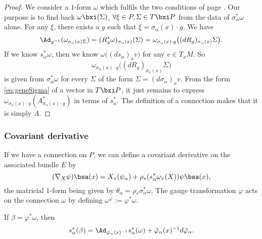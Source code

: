 \begin{proof}
We consider a $1$-form $\omega$ which fulfils the two conditions of page \pageref{pg:def:conne}. Our purpose is to find back $\omega\bxi(\Sigma)$, $\forall\xi\in P,\Sigma\in T\bxi P$ from the data of $\sigma_{\alpha}^*\omega$ alone. For any $\xi$, there exists a $g$ such that $\xi=\sigma_{\alpha}(x)\cdot g$. We have
\begin{equation}
  \Ad_{g^{-1}}(\omega_{\sigma_{\alpha}(x)\Sigma})=(R^*_g\omega)_{\sigma_{\alpha}(x)}(\Sigma)
             =\omega_{\sigma_{\alpha}(x)\cdot g}\big( (dR_g)_{\sigma_{\alpha}(x)}\Sigma \big).
\end{equation}
If we know $s_{\alpha}^*\omega$, then we know $\omega\big(  (ds_{\alpha})_xv  \big)$ for any $v\in T_xM$. So 
\[
   \omega_{\sigma_{\alpha}(x)\cdot g}\big( (dR_g)_{\sigma_{\alpha}(x)}\Sigma\big)
\]
is given from $\sigma_{\alpha}^*\omega$ for every $\Sigma$ of the form $\Sigma=(d\sigma_{\alpha})_xv$. From the form \eqref{eq:geneSigma} of a vector in $T\bxi P$, it just remains to express $\omega_{\sigma_{\alpha}(x)\cdot g}(A^*_{\sigma_{\alpha}(x)\cdot g})$ in terms of $s_{\alpha}^*$. The definition of a connection makes that it is simply $A$.

\end{proof}

\subsubsection{Covariant derivative}

If we have a connection on $P$, we can define a covariant derivative on the associated bundle $E$ by 
\[
  (\nabla_X\psi)\bsa(x)=X_x(\psi_{\alpha})+\rho_*( s_{\alpha}^*\omega_x(X) )\psi\bsa(x),
\]
the matricial $1$-form being given by $\theta_{\alpha}=\rho_*\sigma^*_{\alpha}\omega$. The gauge transformation $\varphi$ acts on the connection $\omega$ by defining $\omega^{\varphi}:=\varphi^*\omega$.

\begin{proposition}
If $\beta=\varphi^*\omega$, then
\[
   s^*_{\alpha}(\beta)=\Ad_{\tilde{\varphi}_{\alpha}(x)^{-1}}s^*_{\alpha}(\omega)+\tilde{\varphi}_{\alpha}(x)^{-1} d\tilde{\varphi}_{\alpha}.
\]
\end{proposition}

